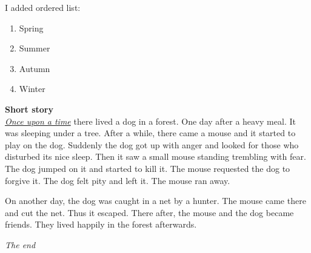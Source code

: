 I added ordered list: 
\begin{enumerate}
    \item Spring
    \item Summer
    \item Autumn
    \item Winter
\end{enumerate}
\begin{center}
\textbf{Short story}\\
\underline{\emph{Once upon a time}} there lived a dog in a forest. One day after a heavy meal. It was sleeping under a tree. After a while, there came a mouse and it started to play on the dog. Suddenly the dog got up with anger and looked for those who disturbed its nice sleep. Then it saw a small mouse standing trembling with fear. The dog jumped on it and started to kill it. The mouse requested the dog to forgive it. The dog felt pity and left it. The mouse ran away. \par
On another day, the dog was caught in a net by a hunter. The mouse came there and cut the net. Thus it escaped. There after, the mouse and the dog became friends. They lived happily in the forest afterwards. \par
\textit{The end}
\end{center}






